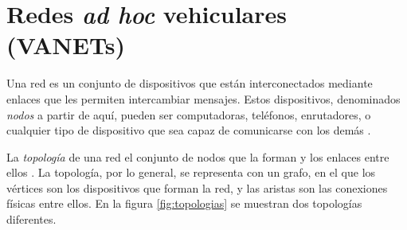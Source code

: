 ﻿\chapter{Redes \textit{ad hoc} vehiculares (VANETs)}
\label{ch:vanets}

% 

Una red es un conjunto de dispositivos que están interconectados mediante
enlaces que les permiten intercambiar mensajes. Estos dispositivos, denominados
\textit{nodos} a partir de aquí, pueden ser computadoras, teléfonos,
enrutadores, o cualquier tipo de dispositivo que sea capaz de comunicarse con
los demás \cite{Marsic2013}.

La \textit{topología} de una red el conjunto de nodos que la forman y los
enlaces entre ellos \cite{Dordal2014}. La topología, por lo general, se
representa con un grafo, en el que los vértices son los dispositivos que forman
la red, y las aristas son las conexiones físicas entre ellos. En la figura
\ref{fig:topologias} se muestran dos topologías diferentes.


